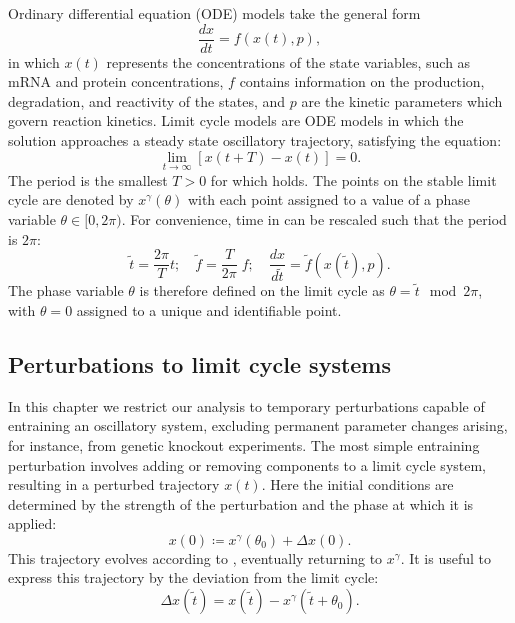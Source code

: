 Ordinary differential equation (ODE) models take the general form
\begin{equation}
  \frac{dx}{dt} = f(x(t), p),
  \label{eq:odefn}
\end{equation}
in which $x(t)$ represents the concentrations of the state variables, such as mRNA and protein concentrations, $f$ contains information on the production, degradation, and reactivity of the states, and $p$ are the kinetic parameters which govern reaction kinetics.
Limit cycle models are ODE models in which the solution approaches a steady state oscillatory trajectory, satisfying the equation:
\begin{equation}
  \lim_{t \to \infty} \left[ x(t + T) - x(t) \right] = 0.
  \label{eq:limit5}
\end{equation}
The period is the smallest $T > 0$ for which  holds.
The points on the stable limit cycle are denoted by $x^\gamma(\theta)$ with each point assigned to a value of a phase variable $\theta \in [0, 2\pi)$.
For convenience, time in  can be rescaled such that the period is $2\pi$:
\begin{equation}
  \tilde{t} = \frac{2\pi}{T}t; \quad \tilde{f} = \frac{T}{2\pi}\;f; \quad \frac{dx}{d\tilde{t}} = \tilde{f}(x(\tilde{t}), p).
  \label{eq:that}
\end{equation}
The phase variable $\theta$ is therefore defined on the limit cycle as $\theta = \tilde{t}\mod 2\pi$, with $\theta = 0$ assigned to a unique and identifiable point.

\subsection{Perturbations to limit cycle systems}

In this chapter we restrict our analysis to temporary perturbations capable of entraining an oscillatory system, excluding permanent parameter changes arising, for instance, from genetic knockout experiments.
The most simple entraining perturbation involves adding or removing components to a limit cycle system, resulting in a perturbed trajectory $x(t)$.
Here the initial conditions are determined by the strength of the perturbation and the phase at which it is applied:
\begin{equation}
  x(0) \coloneqq x^\gamma(\theta_0) + \Delta x(0).
  \label{eq:stateperturbation}
\end{equation}
This trajectory evolves according to , eventually returning to $x^\gamma$.
It is useful to express this trajectory by the deviation from the limit cycle:
\begin{equation}
  \Delta x(\tilde{t}) = x(\tilde{t}) - x^\gamma(\tilde{t} + \theta_0).
  \label{eq:delxt}
\end{equation}

